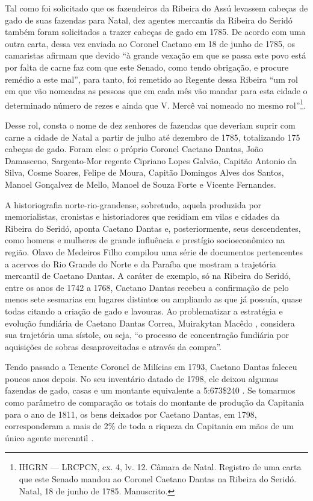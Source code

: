 \begin{refsection}
Tal como foi solicitado que os fazendeiros da Ribeira do Assú levassem cabeças de gado de suas fazendas para Natal, dez agentes mercantis da Ribeira do Seridó também foram solicitados a trazer cabeças de gado em 1785. De acordo com uma outra carta, dessa vez enviada ao Coronel Caetano em 18 de junho de 1785, os camaristas afirmam que devido “à grande vexação em que se passa este povo está por falta de carne faz com que este Senado, como tendo obrigação, e procure remédio a este mal”, para tanto, foi remetido ao Regente dessa Ribeira “um rol em que vão nomeadas as pessoas que em cada mês vão mandar para esta cidade o determinado número de rezes e ainda que V. Mercê vai nomeado no mesmo rol”\footnote{IHGRN --- LRCPCN, cx. 4, lv. 12. Câmara de Natal. Registro de uma carta que este Senado mandou ao Coronel Caetano Dantas na Ribeira do Seridó. Natal, 18 de junho de 1785. Manuscrito.}.

Desse rol, consta o nome de dez senhores de fazendas que deveriam suprir com carne a cidade de Natal a partir de julho até dezembro de 1785, totalizando 175 cabeças de gado. Foram eles: o próprio Coronel Caetano Dantas, João Damasceno, Sargento-Mor regente Cipriano Lopes Galvão, Capitão Antonio da Silva, Cosme Soares, Felipe de Moura, Capitão Domingos Alves dos Santos, Manoel Gonçalvez de Mello, Manoel de Souza Forte e Vicente Fernandes.

A historiografia norte-rio-grandense, sobretudo, aquela produzida por memorialistas, cronistas e historiadores que residiam em vilas e cidades da Ribeira do Seridó, aponta Caetano Dantas e, posteriormente, seus descendentes, como homens e mulheres de grande influência e prestígio socioeconômico na região. Olavo de Medeiros Filho compilou uma série de documentos pertencentes a acervos do Rio Grande do Norte e da Paraíba que mostram a trajetória mercantil de Caetano Dantas. A caráter de exemplo, só na Ribeira do Seridó, entre os anos de 1742 a 1768, Caetano Dantas recebeu a confirmação de pelo menos sete sesmarias em lugares distintos ou ampliando as que já possuía, quase todas citando a criação de gado e lavouras. Ao problematizar a estratégia e evolução fundiária de Caetano Dantas Correa, Muirakytan Macêdo \citeyear[p.~81]{Macedo2007rusticos}, considera sua trajetória uma sístole, ou seja, “o processo de concentração fundiária por aquisições de sobras desaproveitadas e através da compra”.

Tendo passado a Tenente Coronel de Milícias em 1793, Caetano Dantas faleceu poucos anos depois. No seu inventário datado de 1798, ele deixou algumas fazendas de gado, casas e um montante equivalente a 5:673\$240 \cite[p.~120--121]{MedeirosFilho1983velhos}. Se tomarmos como parâmetro de comparação os totais do montante de produção da Capitania para o ano de 1811, os bens deixados por Caetano Dantas, em 1798, corresponderam a mais de 2\% de toda a riqueza da Capitania em mãos de um único agente mercantil \cite{Dias2007carne}.


\end{refsection}
